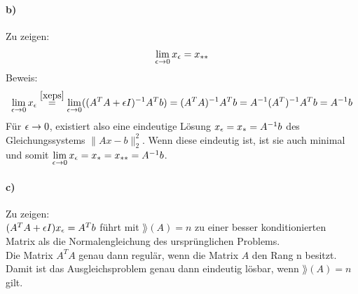 \paragraph*{b)}
Zu zeigen:
\begin{align*}\lim\limits_{\epsilon \rightarrow 0}{x_\epsilon} = x_{**}\end{align*}
Beweis:
\begin{align}
\lim\limits_{\epsilon \rightarrow 0}{x_\epsilon}\overset{\eqref{xeps}}{=}\lim\limits_{\epsilon \rightarrow 0}((A^TA + \epsilon I)^{-1}A^Tb)=(A^TA)^{-1}A^Tb=A^{-1}(A^{T})^{-1}A^Tb=A^{-1}b
\end{align}
Für $\epsilon\rightarrow 0$, existiert also eine eindeutige Lösung $x_\epsilon=x_*=A^{-1}b$ des Gleichungssystems $\|Ax-b\|_2^{2}$. Wenn diese eindeutig ist, ist sie auch minimal und somit $\lim\limits_{\epsilon \rightarrow 0}{x_\epsilon}=x_*=x_{**}=A^{-1}b$.


\paragraph*{c)}
Zu zeigen:\\
$(A^TA + \epsilon I)x_\epsilon = A^Tb$ führt mit $\rang(A) = n$ zu einer besser konditionierten Matrix als die Normalengleichung des ursprünglichen Problems.\\
\newline
Die Matrix $A^TA$ genau dann regulär, wenn die Matrix $A$ den Rang n besitzt. Damit ist das Ausgleichsproblem genau dann eindeutig lösbar, wenn $\rang(A) =n$ gilt.
